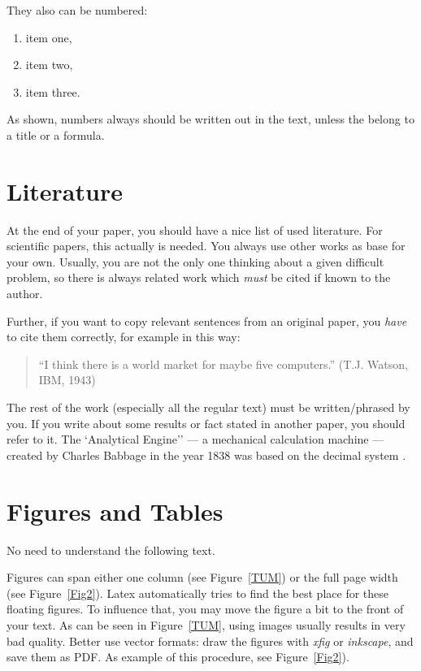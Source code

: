 \documentclass[A4,twocolumn]{article}
\begin{document}
They also can be numbered:

\begin{enumerate}
	\item item one,
	\item item two,
	\item item three.
\end{enumerate}

As shown, numbers always should be written out in the text, unless the
belong to a title or a formula.

\section{Literature}

At the end of your paper, you should have a nice list of used
literature. For scientific papers, this actually is needed. You always
use other works as base for your own. Usually, you are not the only
one thinking about a given difficult problem, so there is always
related work which {\em must} be cited if known to the author.

Further, if you want to copy relevant sentences from an
original paper, you {\em have} to cite them correctly, for example
in this way:

\begin{quote}
	``I think there is a world market for maybe five computers.''
	(T.J. Watson, IBM, 1943)
\end{quote}

The rest of the work (especially all the regular text) must be
written/phrased by you. If you write about some results or fact
stated in another paper, you should refer to it.
The `Analytical Engine'' --- a mechanical calculation machine ---
created by Charles Babbage in the year 1838 was based on the decimal
system
\cite{Brom98}.

\section{Figures and Tables}

No need to understand the following text.

Figures can span either one column (see Figure~\ref{TUM}) or the full
page width (see Figure~\ref{Fig2}).
Latex automatically tries to find the best place for these floating
figures. To influence that, you may move the figure a bit to the front
of your text.
As can be seen in Figure~\ref{TUM}, using images usually results in very
bad quality. Better use vector formats: draw the figures with
{\em xfig} or {\em inkscape}, and save them as PDF. As example of
this procedure, see Figure~\ref{Fig2}).
\end{document}
